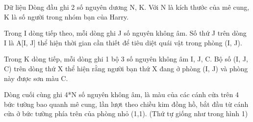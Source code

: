 Dữ liệu
Dòng đầu ghi 2 số nguyên dương N, K. Với N là kích thước của mê cung, K là số người trong nhóm bạn của Harry.

Trong I dòng tiếp theo, mỗi dòng ghi J số nguyên không âm. Số thứ J trên dòng I là A[I, J] thể hiện thời gian cần thiết để tiêu diệt quái vật trong phòng (I, J).

Trong K dòng tiếp, mỗi dòng ghi 1 bộ 3 số nguyên không âm I, J, C. Bộ số (I, J, C) trên dòng thứ X thể hiện rằng người bạn thứ X đang ở phòng (I, J) và phòng này được sơn màu C.

Dòng cuối cùng ghi 4*N số nguyên không âm, là màu của các cánh cửa trên 4 bức tường bao quanh mê cung, lần lượt theo chiều kim đồng hồ, bắt đầu từ cánh cửa ở bức tường phía trên của phòng nhỏ (1,1). (Thứ tự giống như trong hình 1)